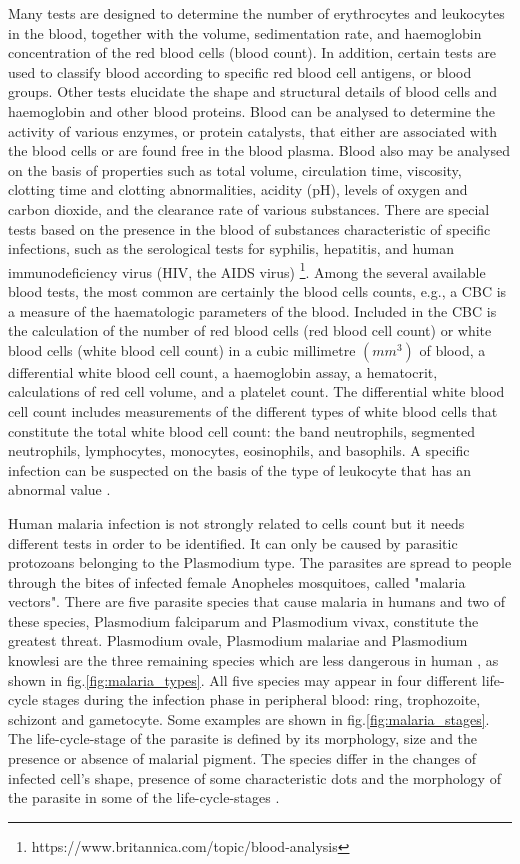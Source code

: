 \documentclass[sensors,review,submit,moreauthors,pdftex,10pt,a4paper]{mdpi}
\begin{document}
Many tests are designed to determine the number of erythrocytes and leukocytes in the blood, together with the volume, sedimentation rate, and haemoglobin concentration of the red blood cells (blood count). In addition, certain tests are used to classify blood according to specific red blood cell antigens, or blood groups. Other tests elucidate the shape and structural details of blood cells and haemoglobin and other blood proteins. Blood can be analysed to determine the activity of various enzymes, or protein catalysts, that either are associated with the blood cells or are found free in the blood plasma.
Blood also may be analysed on the basis of properties such as total volume, circulation time, viscosity, clotting time and clotting abnormalities, acidity (pH), levels of oxygen and carbon dioxide, and the clearance rate of various substances. There are special tests based on the presence in the blood of substances characteristic of specific infections, such as the serological tests for syphilis, hepatitis, and human immunodeficiency virus (HIV, the AIDS virus) \footnote{https://www.britannica.com/topic/blood-analysis}.
Among the several available blood tests, the most common are certainly the blood cells counts, e.g., a CBC is a measure of the haematologic parameters of the blood. Included in the CBC is the calculation of the number of red blood cells (red blood cell count) or white blood cells (white blood cell count) in a cubic millimetre $(mm^{3})$ of blood, a differential white blood cell count, a haemoglobin assay, a hematocrit, calculations of red cell volume, and a platelet count. The differential white blood cell count includes measurements of the different types of white blood cells that constitute the total white blood cell count: the band neutrophils, segmented neutrophils, lymphocytes, monocytes, eosinophils, and basophils. A specific infection can be suspected on the basis of the type of leukocyte that has an abnormal value \cite{DiRuberto2016}.

Human malaria infection is not strongly related to cells count but it needs different tests in order to be identified. It can only be caused by parasitic protozoans belonging to the Plasmodium type. The parasites are spread to people through the bites of infected female Anopheles mosquitoes, called "malaria vectors".
There are five parasite species that cause malaria in humans and two of these species, Plasmodium falciparum and Plasmodium vivax, constitute the greatest threat. Plasmodium ovale, Plasmodium malariae and Plasmodium knowlesi are the three remaining species which are less dangerous in human \cite{WHO_dec_2016}, as shown in fig.\ref{fig:malaria_types}.
All five species may appear in four different life-cycle stages during the infection phase in peripheral blood: ring, trophozoite, schizont and gametocyte. Some examples are shown in fig.\ref{fig:malaria_stages}.
The life-cycle-stage of the parasite is defined by its morphology, size and the presence or absence of malarial pigment.
The species differ in the changes of infected cell's shape, presence of some characteristic dots and the morphology of the parasite in some of the life-cycle-stages \cite{Somasekar2011}.
\end{document}
